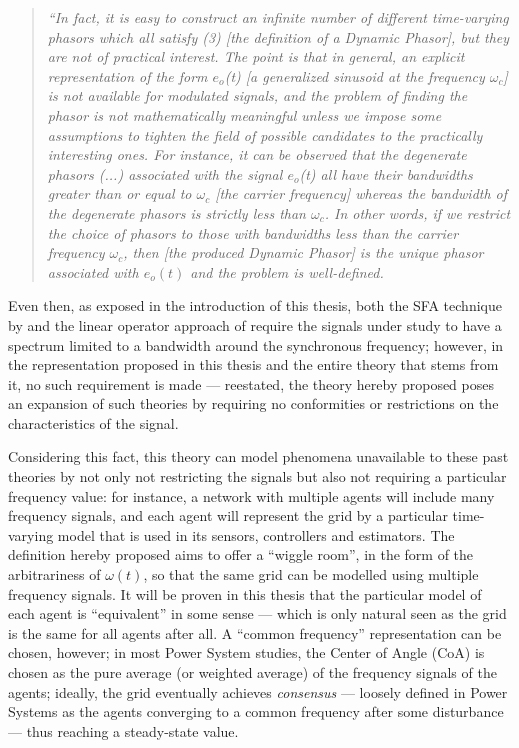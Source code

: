 \begin{quotation}
\textit{``In fact, it is easy to construct an infinite number of different time-varying phasors which all satisfy (3) [the definition of a Dynamic Phasor], but they are not of practical interest. The point is that in general, an explicit representation of the form $e_o$(t) [a generalized sinusoid at the frequency $\omega_c$] is not available for modulated signals, and the problem of finding the phasor is not mathematically meaningful unless we impose some assumptions to tighten the field of possible candidates to the practically interesting ones. For instance, it can be observed that the degenerate phasors (...) associated with the signal $e_o$(t) all have their bandwidths greater than or equal to $\omega_c$ [the carrier frequency] whereas the bandwidth of the degenerate phasors is strictly less than $\omega_c$. In other words, if we restrict the choice of phasors to those with bandwidths less than the carrier frequency $\omega_c$, then [the produced Dynamic Phasor] is the unique phasor associated with $e_o(t)$ and the problem is well-defined.}\hfill{}
\end{quotation}
\vspace{3mm}
	
	Even then, as exposed in the introduction of this thesis, both the SFA technique by \cite{laraRevisitingPowerSystems2024} and the linear operator approach of \cite{Venkatasubramanian1994} require the signals under study to have a spectrum limited to a bandwidth around the synchronous frequency; however, in the representation proposed in this thesis and the entire theory that stems from it, no such requirement is made — reestated, the theory hereby proposed poses an expansion of such theories by requiring no conformities or restrictions on the characteristics of the signal.

	Considering this fact, this theory can model phenomena unavailable to these past theories by not only not restricting the signals but also not requiring a particular frequency value: for instance, a network with multiple agents will include many frequency signals, and each agent will represent the grid by a particular time-varying model that is used in its sensors, controllers and estimators. The definition hereby proposed aims to offer a ``wiggle room'', in the form of the arbitrariness of $\omega(t)$, so that the same grid can be modelled using multiple frequency signals. It will be proven in this thesis that the particular model of each agent is ``equivalent'' in some sense — which is only natural seen as the grid is the same for all agents after all. A ``common frequency'' representation can be chosen, however; in most Power System studies, the Center of Angle (CoA) is chosen as the pure average (or weighted average) of the frequency signals of the agents; ideally, the grid eventually achieves \textit{consensus} — loosely defined in Power Systems as the agents converging to a common frequency after some disturbance — thus reaching a steady-state value.

